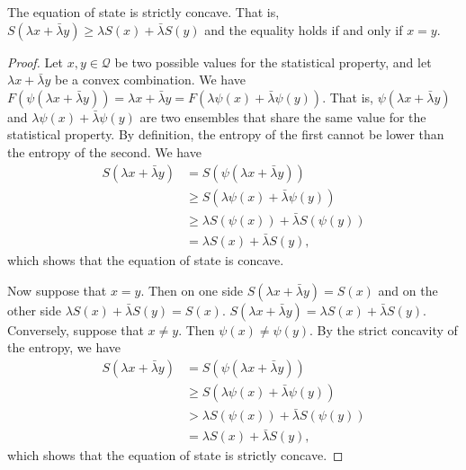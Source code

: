 \begin{prop}
	The equation of state is strictly concave. That is, $S(\lambda x + \bar{\lambda} y) \geq \lambda S(x) + \bar{\lambda} S(y)$ and the equality holds if and only if $x=y$.
\end{prop}

\begin{proof}
	Let $x, y \in \mathcal{Q}$ be two possible values for the statistical property, and let $\lambda x + \bar{\lambda} y$ be a convex combination. We have $F(\psi(\lambda x + \bar{\lambda} y)) = \lambda x + \bar{\lambda} y = F(\lambda \psi(x) + \bar{\lambda} \psi(y))$. That is, $\psi(\lambda x + \bar{\lambda} y)$ and $\lambda \psi(x) + \bar{\lambda} \psi(y)$ are two ensembles that share the same value for the statistical property. By definition, the entropy of the first cannot be lower than the entropy of the second. We have
	\begin{equation}
		\begin{aligned}
			S(\lambda x + \bar{\lambda} y) &= S(\psi(\lambda x + \bar{\lambda} y)) \\
			&\geq S(\lambda \psi(x) + \bar{\lambda} \psi(y)) \\
			&\geq \lambda S(\psi(x)) + \bar{\lambda} S(\psi(y)) \\
			&= \lambda S(x) + \bar{\lambda} S(y),
		\end{aligned}
	\end{equation}
	which shows that the equation of state is concave.
	
	Now suppose that $x=y$. Then on one side $S(\lambda x + \bar{\lambda} y) = S(x)$ and on the other side $\lambda S(x) + \bar{\lambda} S(y) = S(x)$. $S(\lambda x + \bar{\lambda} y) = \lambda S(x) + \bar{\lambda} S(y)$. Conversely, suppose that $x\neq y$. Then $\psi(x) \neq \psi(y)$. By the strict concavity of the entropy, we have
	\begin{equation}
		\begin{aligned}
			S(\lambda x + \bar{\lambda} y) &= S(\psi(\lambda x + \bar{\lambda} y)) \\
			&\geq S(\lambda \psi(x) + \bar{\lambda} \psi(y)) \\
			&> \lambda S(\psi(x)) + \bar{\lambda} S(\psi(y)) \\
			&= \lambda S(x) + \bar{\lambda} S(y),
		\end{aligned}
	\end{equation}
	which shows that the equation of state is strictly concave.
\end{proof}

